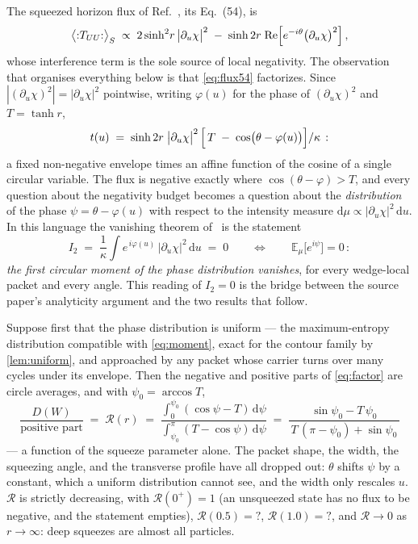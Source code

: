 \documentclass[11pt,a4paper]{article}
\newcommand{\NFRatioHalf}{?}\newcommand{\NFRatioOne}{?}
\newcommand{\dd}{\mathrm{d}}
\theoremstyle{plain}
\theoremstyle{definition}
\begin{document}
The squeezed horizon flux of Ref.~\cite{NariaiI}, its Eq.~(54), is
%
\begin{equation}
\bigl\langle{:}T_{UU}{:}\bigr\rangle_S
\;\propto\;
2\sinh^2\! r\,\bigl|\partial_u\chi\bigr|^2
\;-\;
\sinh 2r\;\mathrm{Re}\Bigl[e^{-i\theta}\bigl(\partial_u\chi\bigr)^2\Bigr]\,,
\label{eq:flux54}
\end{equation}
%
whose interference term is the sole source of local negativity. The
observation that organises everything below is that \cref{eq:flux54}
factorizes. Since $|(\partial_u\chi)^2| = |\partial_u\chi|^2$ pointwise,
writing $\varphi(u)$ for the phase of $(\partial_u\chi)^2$ and
$T = \tanh r$,
%
\begin{equation}
t(u) \;=\; \sinh 2r\;\bigl|\partial_u\chi\bigr|^2\,
\Bigl[\, T \;-\; \cos\bigl(\theta - \varphi(u)\bigr) \Bigr] / \kappa\,:
\label{eq:factor}
\end{equation}
%
a fixed non-negative envelope times an affine function of the cosine of a
single circular variable. The flux is negative exactly where
$\cos(\theta - \varphi) > T$, and every question about the negativity budget
becomes a question about the \emph{distribution} of the phase
$\psi = \theta - \varphi(u)$ with respect to the intensity measure
$\dd\mu \propto |\partial_u\chi|^2\,\dd u$. In this language the vanishing
theorem of~\cite{NariaiI} is the statement
%
\begin{equation}
I_2 \;=\; \frac{1}{\kappa}\int e^{\,i\varphi(u)}\,
\bigl|\partial_u\chi\bigr|^2\,\dd u \;=\; 0
\qquad\Longleftrightarrow\qquad
\mathbb{E}_\mu\bigl[e^{i\psi}\bigr] = 0\,:
\label{eq:moment}
\end{equation}
%
\emph{the first circular moment of the phase distribution vanishes}, for
every wedge-local packet and every angle. This reading of $I_2 = 0$ is the
bridge between the source paper's analyticity argument and the two results
that follow.

Suppose first that the phase distribution is uniform --- the maximum-entropy
distribution compatible with \cref{eq:moment}, exact for the contour family
by \cref{lem:uniform}, and approached by any packet whose carrier turns over
many cycles under its envelope. Then the negative and positive parts of
\cref{eq:factor} are circle averages, and with $\psi_0 = \arccos T$,
%
\begin{equation}
\boxed{\;
\frac{D(W)}{\text{positive part}}
\;=\;
\mathcal{R}(r)
\;=\;
\frac{\displaystyle\int_0^{\psi_0} (\cos\psi - T)\,\dd\psi}
     {\displaystyle\int_{\psi_0}^{\pi} (T - \cos\psi)\,\dd\psi}
\;=\;
\frac{\sin\psi_0 - T\,\psi_0}{\,T\,(\pi - \psi_0) + \sin\psi_0\,}\;}
\label{eq:ratiolaw}
\end{equation}
%
--- a function of the squeeze parameter alone. The packet shape, the width,
the squeezing angle, and the transverse profile have all dropped out:
$\theta$ shifts $\psi$ by a constant, which a uniform distribution cannot
see, and the width only rescales $u$. $\mathcal{R}$ is strictly decreasing,
with $\mathcal{R}(0^+) = 1$ (an unsqueezed state has no flux to be negative,
and the statement empties), $\mathcal{R}(0.5) = \NFRatioHalf$,
$\mathcal{R}(1.0) = \NFRatioOne$, and $\mathcal{R} \to 0$ as
$r \to \infty$: deep squeezes are almost all particles.
\end{document}
